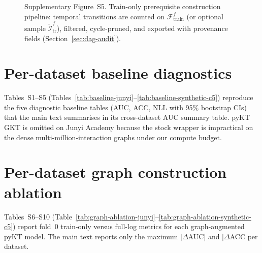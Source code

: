 \documentclass[pdflatex,sn-mathphys-num]{sn-jnl}
\begin{document}
\begin{figure}[!t]
\centering
\caption{Supplementary Figure~S5. Train-only prerequisite construction
pipeline: temporal transitions are counted on $\mathcal{F}^f_{\text{train}}$
(or optional sample $\tilde{\mathcal{I}}^f_{\text{tr}}$), filtered,
cycle-pruned, and exported with provenance fields (Section~\ref{sec:dag-audit}).}
\label{fig:kc-construction}
\end{figure}

\section{Per-dataset baseline diagnostics}
\label{sec:supp-baseline}
Tables~S1--S5 (Tables~\ref{tab:baseline-junyi}--\ref{tab:baseline-synthetic-c5})
reproduce the five diagnostic baseline tables (AUC, ACC, NLL with 95\% bootstrap
CIs) that the main text summarises in its cross-dataset AUC summary table.
pyKT GKT is omitted on Junyi Academy because the stock wrapper is impractical on
the dense multi-million-interaction graphs under our compute budget.



\section{Per-dataset graph construction ablation}
\label{sec:supp-ablation}
Tables~S6--S10 (Table~\ref{tab:graph-ablation-junyi}--\ref{tab:graph-ablation-synthetic-c5})
report fold~0 train-only versus full-log metrics for each graph-augmented pyKT
model. The main text reports only the maximum $|\Delta$AUC| and
$|\Delta$ACC per dataset.
\end{document}
